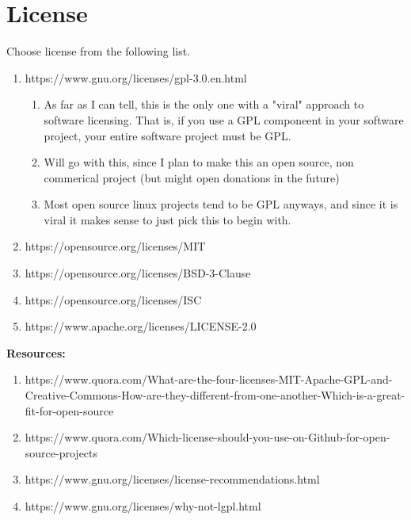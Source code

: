 \section{License}


Choose license from the following list.




\begin{enumerate}
	\item https://www.gnu.org/licenses/gpl-3.0.en.html
	\begin{enumerate}
		\item As far as I can tell, this is the only one with a "viral" approach to software licensing. That is, if you use a GPL componeent in your software project, your entire software project must be GPL.
		\item Will go with this, since I plan to make this an open source, non commerical project (but might open donations in the future)
		\item Most open source linux projects tend to be GPL anyways, and since it is viral it makes sense to just pick this to begin with.
	\end{enumerate}
	\item https://opensource.org/licenses/MIT
	\item https://opensource.org/licenses/BSD-3-Clause
	\item https://opensource.org/licenses/ISC
	\item https://www.apache.org/licenses/LICENSE-2.0
\end{enumerate}


\textbf{Resources:}
\begin{enumerate}
	\item https://www.quora.com/What-are-the-four-licenses-MIT-Apache-GPL-and-Creative-Commons-How-are-they-different-from-one-another-Which-is-a-great-fit-for-open-source
	\item https://www.quora.com/Which-license-should-you-use-on-Github-for-open-source-projects
	\item https://www.gnu.org/licenses/license-recommendations.html
	\item https://www.gnu.org/licenses/why-not-lgpl.html
\end{enumerate}

